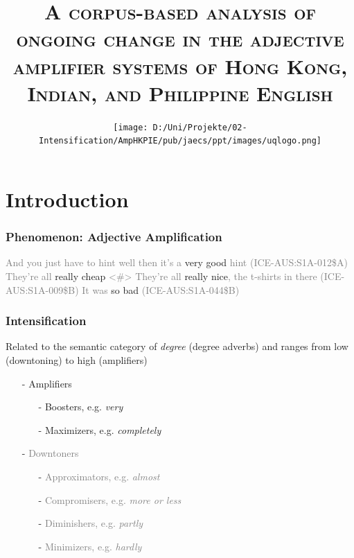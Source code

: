 \documentclass[12pt, table]{beamer}
\author{\color{uq}{\textsc{Dr. Martin Schweinberger \\
slides available at\\
\texttt{www.martinschweinberger.de}\\
\texttt{m.schweinberger@uq.edu.au}\\
\texttt{R} code upon request}}}
\title{\textsc{A corpus-based analysis of ongoing change in the adjective amplifier systems of Hong Kong, Indian, and Philippine English}\\}
\date{\texttt{[image: D:/Uni/Projekte/02-Intensification/AmpHKPIE/pub/jaecs/ppt/images/uqlogo.png]}}
\begin{document}
\begin{frame}[plain]
\titlepage 
\end{frame}

\section{Introduction}

\begin{frame}
\frametitle{Phenomenon: Adjective Amplification}
\begin{exe}
\ex \textcolor{gray}{And you just have to hint well then it's a} \textcolor{uq}{very} good \textcolor{gray}{hint (ICE-AUS:S1A-012\$A)}
\ex \textcolor{gray}{They're all} \textcolor{uq}{really} cheap \textcolor{gray}{<\#> They're all} \textcolor{uq}{really} nice\textcolor{gray}{, the t-shirts in there (ICE-AUS:S1A-009\$B)}
\ex \textcolor{gray}{It was} \textcolor{uq}{so} bad \textcolor{gray}{(ICE-AUS:S1A-044\$B)}
\end{exe}
\end{frame}



\begin{frame}
\frametitle{Intensification}
Related to the semantic category of \textit{degree} (degree adverbs) and ranges from low (downtoning) to high (amplifiers) \\
\begin{scriptsize}
\textcolor{gray}{\citep[589--590]{quirk1985comprehensive}}
\end{scriptsize}
\begin{itemize}
\item[-] Amplifiers
\begin{itemize}
\item[-] Boosters, e.g. \textit{very}
\item[-] Maximizers, e.g. \textit{completely}
\end{itemize}
\item[-] \textcolor{gray}{Downtoners}
\begin{itemize}
\item[-] \textcolor{gray}{Approximators, e.g. \textit{almost}}
\item[-] \textcolor{gray}{Compromisers, e.g. \textit{more or less}}
\item[-] \textcolor{gray}{Diminishers, e.g. \textit{partly}}
\item[-] \textcolor{gray}{Minimizers, e.g. \textit{hardly}}
\end{itemize} 
\end{itemize}
\end{frame}
\end{document}
